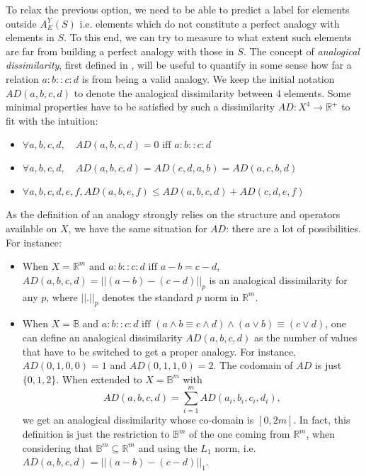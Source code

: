 \documentclass{ecai}
\begin{document}
To relax the previous option, we need to be able to predict a label for
elements outside $A_E^Y(S)$ i.e. elements which do not constitute a perfect analogy
with elements in $S$.  To this end, we can try to measure to what extent such
elements are far from building a perfect analogy with those in $S$.
The concept of {\it analogical dissimilarity}, first  defined in
\cite{BayMicDel2007}, will be useful to  quantify in some sense how far a
relation $a:b::c:d$ is from being a valid analogy.
We keep the initial notation $AD(a,b,c,d)$ to
denote the analogical dissimilarity between 4 elements.  Some  minimal
properties have to be satisfied by such a dissimilarity $AD: X^4 \longrightarrow \mathbb{R}^+$ to fit with the intuition:
\begin{itemize}
\item $\forall a, b, c, d, \quad  AD(a,b,c,d)=0 \mbox{ iff } a:b::c:d$
\item $\forall a, b, c, d, \quad  AD(a,b,c,d)=AD(c,d,a,b)=AD(a,c,b,d)$
\item $\forall a, b, c, d, e, f,  AD(a,b,e,f) \leq AD(a,b,c,d) + AD(c,d,e,f)$
\end{itemize}
As the definition of an analogy strongly relies on the structure and operators
available on $X$, we have the same situation for $AD$: there are a lot of
possibilities. For instance:
\begin{itemize}
\item When $X=\mathbb{R}^m$ and $a:b::c:d \mbox{ iff } a-b=c-d$, $AD(a,b,c,d) =
  ||(a-b)-(c-d)||_p$ is an analogical dissimilarity for any $p$,
  where $||.||_p$ denotes the standard $p$ norm  in $\mathbb{R}^m$.
\item
When $X=\mathbb{B}$ and $a:b::c:d \mbox{ iff } (a \wedge b \equiv c
  \wedge d) \wedge (a \vee  b) \equiv (c \vee d)$, one can define an analogical
  dissimilarity $AD(a,b,c,d)$ as the number of values that have to be switched
  to get a proper analogy. For instance, $AD(0,1,0,0)=1$ and $AD(0,1,1,0)=2$.
The codomain of $AD$ is just $\{0, 1, 2\}$. When extended to
  $X=\mathbb{B}^m$ with $$AD(a,b,c,d) = \sum\limits_{i=1}^m AD(a_i,b_i,c_i,d_i),$$
  we get an analogical dissimilarity whose co-domain is $[0, 2m]$. In fact,
  this definition is just the restriction to $\mathbb{B}^m$ of the one coming
  from $\mathbb{R}^m$, when considering that $\mathbb{B}^m \subseteq
  \mathbb{R}^m$ and using the $L_1$ norm, i.e. $AD(a,b,c,d) = ||(a-b)-(c-d)||_1$.
\end{itemize}
\end{document}
